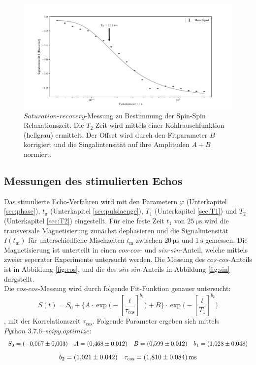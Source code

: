 \begin{figure}[H]
    \centering
    \includegraphics[width=\textwidth]{Auswertung/T2.pdf}
    \caption{$\textit{Saturation-recovery}$-Messung zu Bestimmung der Spin-Spin
    Relaxationszeit. Die $T_2$-Zeit wird mittels einer Kohlrauschfunktion (hellgrau)
    ermittelt. Der Offset wird durch den Fitparameter $B$ korrigiert und die
    Singalintensität auf ihre Amplituden $A+B$ normiert.}
    \label{fig:T2}
\end{figure}

\subsection{Messungen des stimulierten Echos}
\label{sec:stecho}
Das stimulierte Echo-Verfahren wird mit den Parametern $\varphi$ (Unterkapitel
\ref{sec:phase}), $t_{\pi}$ (Unterkapitel \ref{sec:pulslaenge}), $T_1$
(Unterkapitel \ref{sec:T1}) und $T_2$ (Unterkapitel \ref{sec:T2}) eingestellt.
Für eine feste Zeit $t_1$ von $\SI{25}{\micro\second}$ wird die transversale
Magnetisierung zunächst dephasieren
und die Signalintensität $I(t_{\text{m}})$ für unterschiedliche Mischzeiten
$t_{\text{m}}$ zwischen $\SI{20}{\micro\second}$ und $\SI{1}{\second}$ gemessen.
Die Magnetisierung ist unterteilt in einen $cos$-$cos$- und $sin$-$sin$-Anteil, welche
mittels zweier seperater Experimente untersucht werden. Die Messung des
$cos$-$cos$-Anteils ist in Abbildung \ref{fig:cos}, und die des $sin$-$sin$-Anteils
in Abbildung \ref{fig:sin} dargstellt.\\
Die $cos$-$cos$-Messung wird durch folgende Fit-Funktion genauer untersucht:
\begin{equation*}
  S(t) = S_0 + \biggl\{
  A \cdot \exp\biggl(-\left[\frac{t}{\tau_{\text{cos}}} \right]^{b_1}
  \biggr) + B
  \biggr\} \cdot
  \exp\biggl(-\left[\frac{t}{T_1} \right]^{b_2}
  \biggr)
\end{equation*}
\noindent,
mit der Korrelationszeit $\tau_{\text{cos}}$. Folgende Parameter ergeben sich
mittels $\textit{Python 3.7.6--scipy.optimize}$:
\begin{equation*}
  S_0 = \SI{-0.067\pm0.003}{}
  \quad
  A   = \SI{0.468\pm0.012}{}
  \quad
  B   = \SI{0.599\pm0.012}{}
  \quad
  b_1 = \SI{1,028\pm0,048}{}
\end{equation*}
\begin{equation*}
  b_2 = \SI{1,021\pm0.042}{}
  \quad
  \tau_{\text{cos}} = \SI{1,810\pm0,084}{\milli\second}
\end{equation*}

